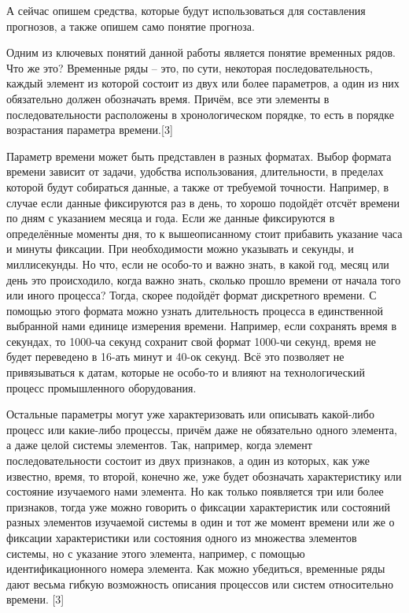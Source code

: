 {\gostFont

  \par \redline А сейчас опишем средства, которые будут использоваться для составления прогнозов, а также опишем само понятие прогноза.

  \par \redline Одним из ключевых понятий данной работы является понятие временных рядов. Что же это? Временные ряды {--} это, по сути, некоторая последовательность, каждый элемент из которой состоит из двух или более параметров, а один из них обязательно должен обозначать время. Причём, все эти элементы в последовательности расположены в хронологическом порядке, то есть в порядке возрастания параметра времени.[3]

  \par \redline Параметр времени может быть представлен в разных форматах. Выбор формата времени зависит от задачи, удобства использования, длительности, в пределах которой будут собираться данные, а также от требуемой точности. Например, в случае если данные фиксируются раз в день, то хорошо подойдёт отсчёт времени по дням с указанием месяца и года. Если же данные фиксируются в определённые моменты дня, то к вышеописанному стоит прибавить указание часа и минуты фиксации. При необходимости можно указывать и секунды, и миллисекунды. Но что, если не особо-то и важно знать, в какой год, месяц или день это происходило, когда важно знать, сколько прошло времени от начала того или иного процесса? Тогда, скорее подойдёт формат дискретного времени. С помощью этого формата можно узнать длительность процесса в единственной выбранной нами единице измерения времени. Например, если сохранять время в секундах, то 1000-ча секунд сохранит свой формат 1000-чи секунд, время не будет переведено в 16-ать минут и 40-ок секунд. Всё это позволяет не привязываться к датам, которые не особо-то и влияют на технологический процесс промышленного оборудования.

  \par \redline Остальные параметры могут уже характеризовать или описывать какой-либо процесс или какие-либо процессы, причём даже не обязательно одного элемента, а даже целой системы элементов. Так, например, когда элемент последовательности состоит из двух признаков, а один из которых, как уже известно, время, то второй, конечно же, уже будет обозначать характеристику или состояние изучаемого нами элемента. Но как только появляется три или более признаков, тогда уже можно говорить о фиксации характеристик или состояний разных элементов изучаемой системы в один и тот же момент времени или же о фиксации характеристики или состояния одного из множества элементов системы, но с указание этого элемента, например, с помощью идентификационного номера элемента. Как можно убедиться, временные ряды дают весьма гибкую возможность описания процессов или систем относительно времени. [3]

}
